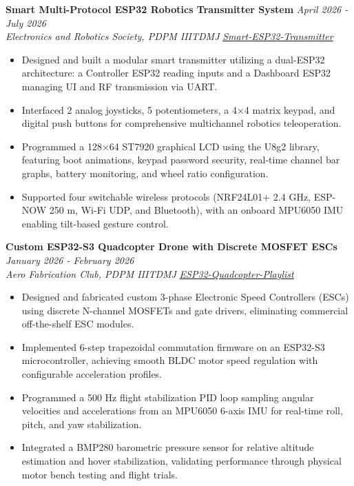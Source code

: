 \documentclass[10pt,a4paper]{article}
\begin{document}
\vspace{3pt}
\textbf{Smart Multi-Protocol ESP32 Robotics Transmitter System} \hfill \textit{April 2026 - July 2026}\\
\textit{Electronics and Robotics Society, PDPM IIITDMJ} \hfill \textit{\href{https://github.com/Humobot1812/Smart-Multi-Protocol-ESP32-Transmitter}{Smart-ESP32-Transmitter}}
\begin{itemize}[leftmargin=1.2rem,itemsep=1.5pt,topsep=2pt,parsep=0pt]
  \item Designed and built a modular smart transmitter utilizing a dual-ESP32 architecture: a Controller ESP32 reading inputs and a Dashboard ESP32 managing UI and RF transmission via UART.
  \item Interfaced 2 analog joysticks, 5 potentiometers, a 4×4 matrix keypad, and digital push buttons for comprehensive multichannel robotics teleoperation.
  \item Programmed a 128×64 ST7920 graphical LCD using the U8g2 library, featuring boot animations, keypad password security, real-time channel bar graphs, battery monitoring, and wheel ratio configuration.
  \item Supported four switchable wireless protocols (NRF24L01+ 2.4 GHz, ESP-NOW 250 m, Wi-Fi UDP, and Bluetooth), with an onboard MPU6050 IMU enabling tilt-based gesture control.
\end{itemize}

\vspace{3pt}
\textbf{Custom ESP32-S3 Quadcopter Drone with Discrete MOSFET ESCs} \hfill \textit{January 2026 - February 2026}\\
\textit{Aero Fabrication Club, PDPM IIITDMJ} \hfill \textit{\href{https://youtube.com/playlist?list=PLQcgql__dXrcVR0A4IEijRmWpTvdtAOpG}{ESP32-Quadcopter-Playlist}}
\begin{itemize}[leftmargin=1.2rem,itemsep=1.5pt,topsep=2pt,parsep=0pt]
  \item Designed and fabricated custom 3-phase Electronic Speed Controllers (ESCs) using discrete N-channel MOSFETs and gate drivers, eliminating commercial off-the-shelf ESC modules.
  \item Implemented 6-step trapezoidal commutation firmware on an ESP32-S3 microcontroller, achieving smooth BLDC motor speed regulation with configurable acceleration profiles.
  \item Programmed a 500 Hz flight stabilization PID loop sampling angular velocities and accelerations from an MPU6050 6-axis IMU for real-time roll, pitch, and yaw stabilization.
  \item Integrated a BMP280 barometric pressure sensor for relative altitude estimation and hover stabilization, validating performance through physical motor bench testing and flight trials.
\end{itemize}
\end{document}
